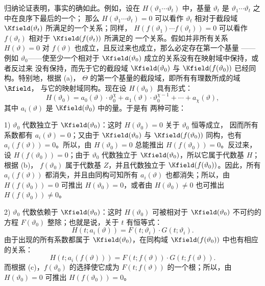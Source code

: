 归纳论证表明，事实的确如此。例如，设在
\(H(\vartheta_1\cdots\vartheta_t)\) 中，基量 \(\vartheta_t\) 是
\(\vartheta_1\cdots\vartheta_t\) 之中在良序下最后的一个；
 那么
\(H(\vartheta_1\cdots\vartheta_t)=0\) 可以看作 \(\vartheta_t\)
相对于截段域 \(\Kfield(\vartheta_t)\) 所满足的一个关系；同样，
\(H(f(\vartheta_1)\cdots f(\vartheta_t))=0\) 可以看作
\(f(\vartheta_t)\) 相对于 \(\Kfield(f(\vartheta_t))\) 所满足的
一个关系。假如并非所有关系 \(H(\vartheta)=0\) 对
\(f(\vartheta)\) 也成立，且反过来也成立，那么必定存在第一个基量
——例如 \(\vartheta_0\)——使至少一个相对于
\(\Kfield(\vartheta_0)\) 成立的关系没有在映射域中保持，或者反过来
没有保持，而先于它的截段域 \(\Kfield(\vartheta_0)\) 与
\(\Kfield(f(\vartheta_0))\) 已经同构。特别地，根据 (a)，
\(\Theta\) 的第一个基量的截段域，即所有有理数所成的域 \(\Rfield\)，
与它的映射域同构。现在设 \(H(\vartheta_0)\) 具有形式：
\[
H(\vartheta_0)=a_0(\vartheta)\cdot\vartheta_0^\chi
+a_1(\vartheta)\cdot\vartheta_0^{\chi-1}+\cdots+a_\chi(\vartheta),
\]
其中 \(a_i(\vartheta)\) 是 \(\Kfield(\vartheta_0)\) 中的量。于是有
两种可能：

1) \(\vartheta_0\) 代数独立于 \(\Kfield(\vartheta_0)\)：这时
\(H(\vartheta_0)=0\) 关于 \(\vartheta_0\) 恒等成立，
 因而所有系数都有
\(a_i(\vartheta)=0\)；又由于 \(\Kfield(\vartheta_0)\) 与
\(\Kfield(f(\vartheta_0))\) 同构，也有
\(a_i(f(\vartheta))=0\)。所以，由 \(H(\vartheta_0)=0\) 总能推出
\(H(f(\vartheta_0))=0\)。反过来，设
\(H(f(\vartheta_0))=0\)；由于 \(\vartheta_0\) 代数独立于
\(\Kfield(\vartheta_0)\)，所以它属于代数基 \(H\)；根据 (b)，
\(f(\vartheta_0)\) 属于代数基 \(Z\)，并且代数独立于
\(\Kfield(f(\vartheta_0))\)。因此，所有
\(a_i(f(\vartheta))\) 都消失，并且由同构可知所有
\(a_i(\vartheta)\) 也都消失；所以，由
\(H(f(\vartheta_0))=0\) 可推出 \(H(\vartheta_0)=0\)，或者由
\(H(\vartheta_0)\ne0\) 也可推出 \(H(f(\vartheta_0))\ne0\)。

2) \(\vartheta_0\) 代数依赖于 \(\Kfield(\vartheta_0)\)：这时
\(H(\vartheta_0)\) 可被相对于 \(\Kfield(\vartheta_0)\) 不可约的
方程 \(F(\vartheta_0)\) 整除；也就是说，关于 \(t\) 有恒等式：
\[
H(t;a_i(\vartheta))=F(t;\vartheta_i)\cdot G(t;\vartheta_i).
\]
由于出现的所有系数都属于 \(\Kfield(\vartheta_0)\)，在同构域
\(\Kfield(f(\vartheta_0))\) 中也有相应的关系：
\[
H(t;a_i(f(\vartheta)))=F(t;f(\vartheta))\cdot G(t;f(\vartheta)).
\]
而根据 (c)，\(f(\vartheta_0)\) 的选择使它成为
\(F(t;f(\vartheta))\) 的一个根；所以，由 \(H(\vartheta_0)=0\)
可推出 \(H(f(\vartheta_0))=0\)。

